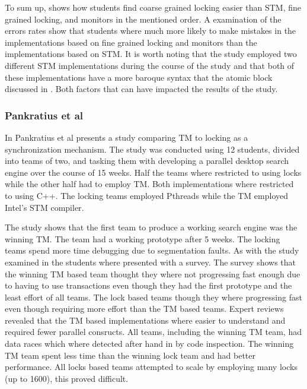 To sum up, \cite{rossbach2010transactional} shows how students find coarse grained locking easier than \ac{STM}, fine grained locking, and monitors in the mentioned order\cite[p. 54]{rossbach2010transactional}. A examination of the errors rates show that students where much more likely to make mistakes in the implementations based on fine grained locking and monitors than the implementations based on \ac{STM}\cite[p. 54]{rossbach2010transactional}. It is worth noting that the study employed two different \ac{STM} implementations during the course of the study and that both of these implementations have a more baroque syntax that the atomic block discussed in \cite[p. 49]{rossbach2010transactional}. Both factors that can have impacted the results of the study.

\subsubsection{Pankratius et al}
\label{sec:stm_ease_pankratius}
In \cite{pankratius2009does} Pankratius et al presents a study comparing \ac{TM} to locking as a synchronization mechanism. The study was conducted using 12 students, divided into teams of two, and tasking them with developing a parallel desktop search engine over the course of 15 weeks. Half the teams where restricted to using locks while the other half had to employ \ac{TM}. Both implementations where restricted to using C++. The locking teams employed Pthreads\cite[p. 2]{pankratius2009does} while the \ac{TM} employed Intel’s STM compiler\cite[p. 3]{pankratius2009does}.

The study shows that the first team to produce a working search engine was the winning \ac{TM}\cite[p. 6]{pankratius2009does}. The team had a working prototype after 5 weeks.   The locking teams spend more time debugging due to segmentation faults\cite[p. 6]{pankratius2009does}. As with the study examined in  the students where presented with a survey. The survey shows that the  winning \ac{TM} based team thought they where not progressing fast enough due to having to use transactions even though they had the first prototype and the least effort of all teams. The lock based teams though they where progressing fast even though requiring more effort than the \ac{TM} based teams\cite[p. 6]{pankratius2009does}. Expert reviews revealed that the \ac{TM} based implementations where easier to understand and required fewer parallel consructs\cite[p. 6]{pankratius2009does}. All teams, including the winning \ac{TM} team, had data races which where detected after hand in by code inspection\cite[p. 6]{pankratius2009does}. The winning \ac{TM} team spent less time than the winning lock team and had better performance\cite[p. 23]{pankratius2009does}. All locks based teams attempted to scale by employing many locks (up to 1600),  this proved difficult\cite[p. 23]{pankratius2009does}.

